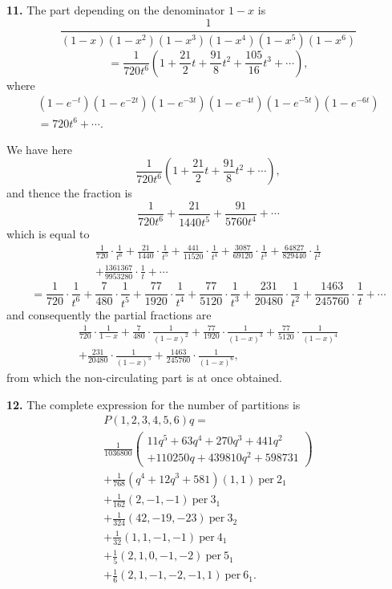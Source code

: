 \documentclass[12pt,a4paper]{article}
\theoremstyle{definition}
\begin{document}
\medskip
\noindent\textbf{11.} The part depending on the denominator $1-x$ is
\[\frac{1}{(1-x)(1-x^2)(1-x^3)(1-x^4)(1-x^5)(1-x^6)}\]
\[= \frac{1}{720t^6}\left(1 + \frac{21}{2}t + \frac{91}{8}t^2 + \frac{105}{16}t^3 + \cdots\right),\]
where
\begin{multline*}
(1-e^{-t})(1-e^{-2t})(1-e^{-3t})(1-e^{-4t})(1-e^{-5t})(1-e^{-6t}) \\
= 720t^6 + \cdots.
\end{multline*}

We have here
\[\frac{1}{720t^6}\left(1 + \frac{21}{2}t + \frac{91}{8}t^2 + \cdots\right),\]
and thence the fraction is
\[\frac{1}{720t^6} + \frac{21}{1440t^5} + \frac{91}{5760t^4} + \cdots\]
which is equal to
\begin{multline*}
\frac{1}{720}\cdot\frac{1}{t^6} + \frac{21}{1440}\cdot\frac{1}{t^5} + \frac{441}{11520}\cdot\frac{1}{t^4} + \frac{3087}{69120}\cdot\frac{1}{t^3} + \frac{64827}{829440}\cdot\frac{1}{t^2} \\
+ \frac{1361367}{9953280}\cdot\frac{1}{t} + \cdots
\end{multline*}
\[= \frac{1}{720}\cdot\frac{1}{t^6} + \frac{7}{480}\cdot\frac{1}{t^5} + \frac{77}{1920}\cdot\frac{1}{t^4} + \frac{77}{5120}\cdot\frac{1}{t^3} + \frac{231}{20480}\cdot\frac{1}{t^2} + \frac{1463}{245760}\cdot\frac{1}{t} + \cdots\]
and consequently the partial fractions are
\begin{multline*}
\frac{1}{720}\cdot\frac{1}{1-x} + \frac{7}{480}\cdot\frac{1}{(1-x)^2} + \frac{77}{1920}\cdot\frac{1}{(1-x)^3} + \frac{77}{5120}\cdot\frac{1}{(1-x)^4} \\
+ \frac{231}{20480}\cdot\frac{1}{(1-x)^5} + \frac{1463}{245760}\cdot\frac{1}{(1-x)^6},
\end{multline*}
from which the non-circulating part is at once obtained.

\newpage

\medskip
\noindent\textbf{12.} The complete expression for the number of partitions is
\begin{multline*}
P(1,2,3,4,5,6)q = \\
\frac{1}{1036800}\left(\begin{array}{c}
11q^5 + 63q^4 + 270q^3 + 441q^2 \\
+ 110250q + 439810q^2 + 598731
\end{array}\right) \\
+ \frac{1}{768}(q^4 + 12q^3 + 581)(1,1)\ \mathrm{per}\ 2_1 \\
+ \frac{1}{162}(2,-1,-1)\ \mathrm{per}\ 3_1 \\
+ \frac{1}{324}(42,-19,-23)\ \mathrm{per}\ 3_2 \\
+ \frac{1}{32}(1,1,-1,-1)\ \mathrm{per}\ 4_1 \\
+ \frac{1}{5}(2,1,0,-1,-2)\ \mathrm{per}\ 5_1 \\
+ \frac{1}{6}(2,1,-1,-2,-1,1)\ \mathrm{per}\ 6_1.
\end{multline*}
\end{document}
